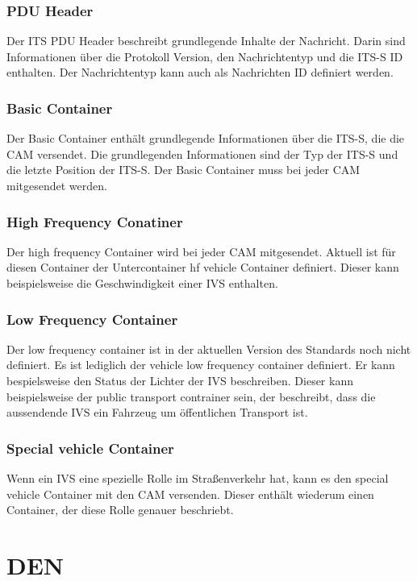 \subsubsection{PDU Header \label{facilitylayer_PduHeader}}
Der \ac{ITS} \ac{PDU} Header beschreibt grundlegende Inhalte der Nachricht. Darin sind Informationen über die Protokoll Version, den Nachrichtentyp und die \ac{ITS-S} \ac{ID} enthalten. Der Nachrichtentyp kann auch als Nachrichten \ac{ID} definiert werden. 


\subsubsection{Basic Container}
Der Basic Container enthält grundlegende Informationen über die \ac{ITS-S}, die die \ac{CAM} versendet. Die grundlegenden Informationen sind der Typ der \ac{ITS-S} und die letzte Position der \ac{ITS-S}. Der Basic Container muss bei jeder \ac{CAM} mitgesendet werden.

\subsubsection{High Frequency Conatiner}
Der high frequency Container wird bei jeder \ac{CAM} mitgesendet. Aktuell ist für diesen Container der Untercontainer hf vehicle Container definiert. Dieser kann beispielsweise die Geschwindigkeit einer \ac{IVS} enthalten. 


\subsubsection{Low Frequency Container}
Der low frequency container ist in der aktuellen Version des Standards \cite{en302637-2} noch nicht definiert. Es ist lediglich der vehicle low frequency container definiert. Er kann bespielsweise den Status der Lichter der \ac{IVS} beschreiben. Dieser kann beispielsweise der public transport contrainer sein, der beschreibt, dass die aussendende \ac{IVS} ein Fahrzeug um öffentlichen Transport ist.

\subsubsection{Special vehicle Container}
Wenn ein \ac{IVS} eine spezielle Rolle im Straßenverkehr hat, kann es den special vehicle Container mit den \ac{CAM} versenden. Dieser enthält wiederum einen Container, der diese Rolle genauer beschriebt. 
\section{DEN\label{sec:den}}
